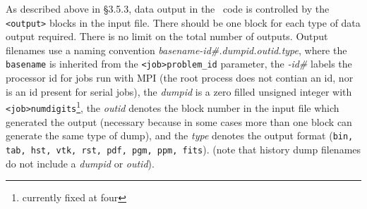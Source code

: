 As described above in \S 3.5.3, data output in the \ath\ code is
controlled by the {\tt <output>} blocks in the input file.  There should
be one block for each type of data output required.  There is no limit on
the total number of outputs.  Output filenames use a naming convention
{\it basename-id\#.dumpid.outid.type}, where the {\tt basename} is inherited
from the {\tt <job>problem\_id} parameter, the {\it -id\#} labels the
processor id for jobs run with MPI (the root process does not contian an
id, nor is an id present for serial jobs), the {\it dumpid} is a zero
filled unsigned integer with {\tt <job>numdigits}\footnote{currently
fixed at four}, the {\it outid} denotes the block number in the input
file which generated the output (necessary because in some cases more
than one block can generate the same type of dump), and the {\it type}
denotes the output format ({\tt bin, tab, hst, vtk, rst, pdf, pgm, ppm, fits}).
(note that history dump filenames do not include a {\it dumpid} or
{\it outid}). 

